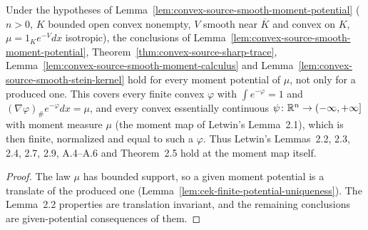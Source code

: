 \begin{theorem}
  \label{thm:letwin-every-moment-potential}
  \leanok
  Under the hypotheses of Lemma~\ref{lem:convex-source-smooth-moment-potential} ($n>0$, $K$ bounded open convex
  nonempty, $V$ smooth near $\overline K$ and convex on $K$, $\mu=1_Ke^{-V}dx$ isotropic), the conclusions of
  Lemma~\ref{lem:convex-source-smooth-moment-potential}, Theorem~\ref{thm:convex-source-sharp-trace},
  Lemma~\ref{lem:convex-source-smooth-moment-calculus} and Lemma~\ref{lem:convex-source-smooth-stein-kernel} hold for
  every moment potential of $\mu$, not only for a produced one. This covers every finite convex $\varphi$ with
  $\int e^{-\varphi}=1$ and $(\nabla\varphi)_\#e^{-\varphi}dx=\mu$, and every convex essentially continuous
  $\psi\colon\mathbb{R}^n\to(-\infty,+\infty]$ with moment measure $\mu$ (the moment map of Letwin's Lemma~2.1), which is then
  finite, normalized and equal to such a $\varphi$. Thus Letwin's Lemmas~2.2, 2.3, 2.4, 2.7, 2.9, A.4--A.6 and
  Theorem~2.5 hold at the moment map itself.
\end{theorem}
\begin{proof}
  \leanok
  The law $\mu$ has bounded support, so a given moment potential is a translate of the produced one
  (Lemma~\ref{lem:cek-finite-potential-uniqueness}). The Lemma~2.2 properties are translation invariant, and the
  remaining conclusions are given-potential consequences of them.
\end{proof}

